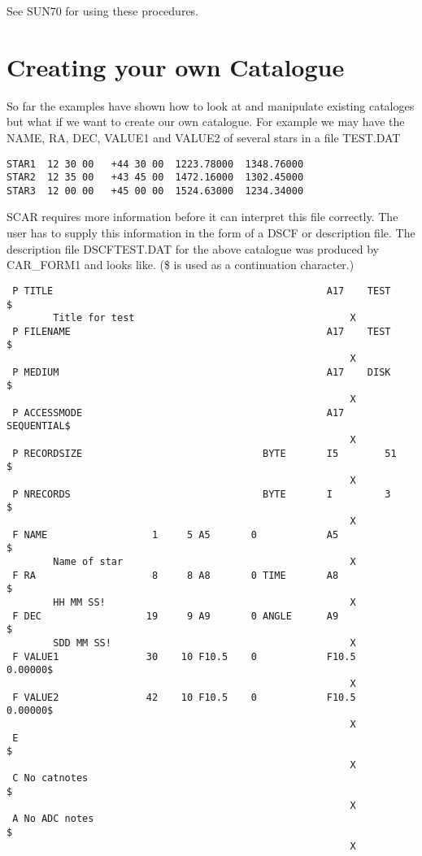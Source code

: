 See SUN70 for using these procedures.

\section{Creating your own Catalogue}

So far the examples have shown how to look at and manipulate existing cataloges
but what if we want to create our own catalogue. For example we may have the
NAME, RA, DEC, VALUE1 and VALUE2 of several stars in a file TEST.DAT

\begin{verbatim}
STAR1  12 30 00   +44 30 00  1223.78000  1348.76000      
STAR2  12 35 00   +43 45 00  1472.16000  1302.45000 
STAR3  12 00 00   +45 00 00  1524.63000  1234.34000      
\end{verbatim}

SCAR requires more information before it can interpret this file correctly.
The user has to supply this information in the form of a DSCF or description
file. The description file DSCFTEST.DAT for the above catalogue was produced 
by CAR\_FORM1 and looks like. (\$ is used as a continuation character.) 


\begin{verbatim} 
 P TITLE                                               A17    TEST      $
        Title for test                                     X
 P FILENAME                                            A17    TEST      $
                                                           X
 P MEDIUM                                              A17    DISK      $
                                                           X
 P ACCESSMODE                                          A17    SEQUENTIAL$
                                                           X
 P RECORDSIZE                               BYTE       I5        51     $
                                                           X
 P NRECORDS                                 BYTE       I         3      $
                                                           X
 F NAME                  1     5 A5       0            A5               $
        Name of star                                       X
 F RA                    8     8 A8       0 TIME       A8               $
        HH MM SS!                                          X
 F DEC                  19     9 A9       0 ANGLE      A9               $
        SDD MM SS!                                         X
 F VALUE1               30    10 F10.5    0            F10.5     0.00000$
                                                           X
 F VALUE2               42    10 F10.5    0            F10.5     0.00000$
                                                           X
 E                                                                      $
                                                           X
 C No catnotes                                                          $
                                                           X
 A No ADC notes                                                         $
                                                           X
\end{verbatim}

